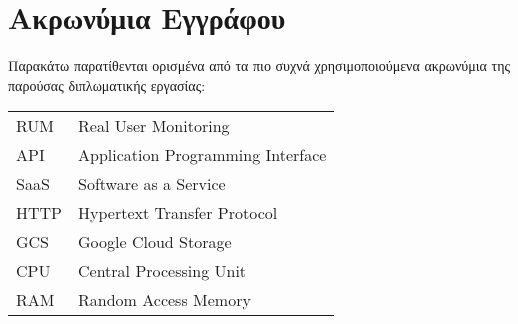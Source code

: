 \chapter*{Ακρωνύμια Εγγράφου}
\label{append:acronyms}
{}

Παρακάτω παρατίθενται ορισμένα από τα πιο συχνά χρησιμοποιούμενα ακρωνύμια της
παρούσας διπλωματικής εργασίας:

\begin{table}[htpb]
  \centering
  \begin{tabular}{l@{$\;\;\longrightarrow\;\;$}l}
	RUM & Real User Monitoring \\
  API & Application Programming Interface \\
  SaaS & Software as a Service \\
  HTTP & Hypertext Transfer Protocol \\
  GCS & Google Cloud Storage \\
  CPU & Central Processing Unit \\
  RAM & Random Access Memory \\
  \end{tabular}
\end{table}